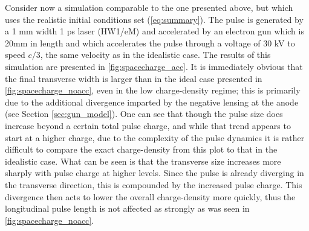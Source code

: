 Consider now a simulation comparable to the one presented above, but which uses the realistic initial conditions set (\ref{eq:summary}).
The pulse is generated by a 1 mm width 1 ps laser (HW1/eM) and accelerated by an electron gun which is 20mm in length and which accelerates the pulse through a voltage of 30 kV to speed $c/3$, the same velocity as in the idealistic case.
The results of this simulation are presented in \ref{fig:spacecharge_acc}.
It is immediately obvious that the final transverse width is larger than in the ideal case presented in \ref{fig:spacecharge_noacc}, even in the low charge-density regime; this is primarily due to the additional divergence imparted by the negative lensing at the anode (see Section \ref{sec:gun_model}).
One can see that though the pulse size does increase beyond a certain total pulse charge, and while that trend appears to start at a higher charge, due to the complexity of the pulse dynamics it is rather difficult to compare the exact charge-density from this plot to that in the idealistic case.
What can be seen is that the transverse size increases more sharply with pulse charge at higher levels.
Since the pulse is already diverging in the transverse direction, this is compounded by the increased pulse charge.
This divergence then acts to lower the overall charge-density more quickly, thus the longitudinal pulse length is not affected as strongly as was seen in \ref{fig:spacecharge_noacc}.


